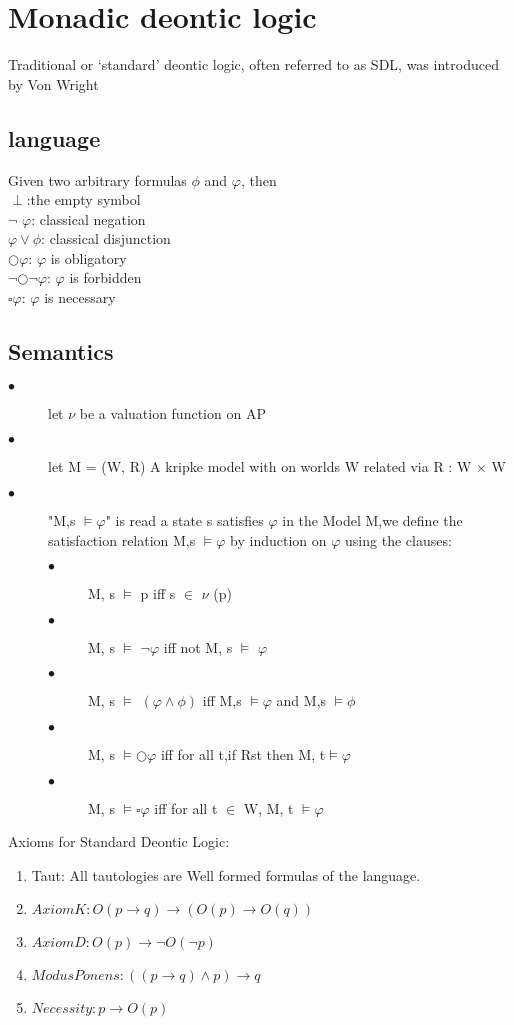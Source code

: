 \documentclass{article}
\begin{document}
\section{Monadic deontic logic}
Traditional or ‘standard’ deontic logic, often referred to as SDL, was introduced by
Von Wright\cite{4} 
\subsection{language}
Given two arbitrary formulas $\phi$  and $\varphi$, then\\
$\perp$:the empty symbol\\
$\neg$ $\varphi$: classical negation\\
$\varphi \vee  \phi $: classical disjunction\\
$\bigcirc \varphi $: $\varphi$ is obligatory\\
$ \neg \bigcirc\neg\varphi$: $ \varphi$ is forbidden\\
$ \square\varphi$: $\varphi$ is necessary
\subsection{Semantics}
\begin{description}
\item[$\bullet$ ] let $\nu$ be a valuation function on AP
\item[$\bullet $]  let M = (W, R) A kripke model with on worlds W related via R : W × W
\item[$\bullet $]  "M,s $ \vDash \varphi$" is read a state s satisfies $\varphi$ in the Model M,we define the satisfaction relation M,s $ \vDash \varphi$ by induction on $\varphi$ using the clauses:
\begin{description}
\item[$\bullet$ ]M, s $ \vDash $ p iff s $\in$ $\nu$  (p)
\item[$\bullet$ ]M, s $ \vDash $ $\neg \varphi$ iff not M, s $ \vDash $ $\varphi$
\item[$\bullet$ ]M, s $ \vDash $ $(\varphi\land\phi )$ iff M,s $ \vDash \varphi$ and  M,s $ \vDash \phi$
\item[$\bullet$ ]M, s $ \vDash  \bigcirc\varphi$ iff for all t,if Rst then M, t$\vDash \varphi$
\item[$\bullet$ ]M, s $ \vDash  \square\varphi$ iff for all t $\in$ W, M, t $\vDash \varphi$
\end{description}
\end{description}
Axioms for Standard Deontic Logic:
\begin{enumerate}
\item Taut: All tautologies are Well formed formulas of the language.
\item  $Axiom K: O(p \to q) \to (O(p) \to O(q)) $
\item $ Axiom D: O(p) \to \neg O(\neg p)$
\item $Modus Ponens: ((p \to q) \land p) \to q $
\item $ Necessity: p \to O(p)$
\end{enumerate}
\end{document}
